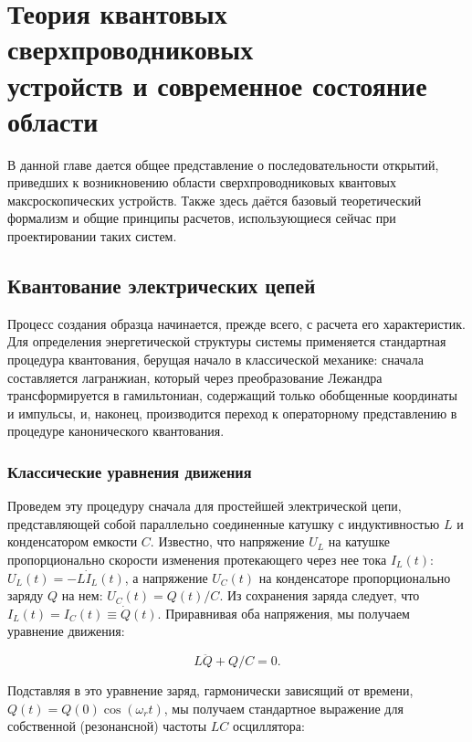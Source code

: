 \documentclass[14pt, a4paper]{extreport}
\numberwithin{equation}{section}
\begin{document}
\chapter{Теория квантовых сверхпроводниковых\\ устройств и современное состояние области}

В данной главе дается общее представление о последовательности открытий, приведших к возникновению области сверхпроводниковых квантовых максроскопических устройств. Также здесь даётся базовый теоретический формализм и общие принципы расчетов, использующиеся сейчас при проектировании таких систем. 

\section{Квантование электрических цепей}\label{sec:circuit_quantization}


Процесс создания образца начинается, прежде всего, с расчета его характеристик. Для определения энергетической структуры системы применяется стандартная процедура квантования, берущая начало в классической механике: сначала составляется лагранжиан, который через преобразование Лежандра трансформируется в гамильтониан, содержащий только обобщенные координаты и импульсы, и, наконец, производится переход к операторному представлению в процедуре канонического квантования. 

\subsection{Классические уравнения движения}


Проведем эту процедуру сначала для простейшей электрической цепи, представляющей собой параллельно соединенные катушку с индуктивностью $L$ и конденсатором емкости $C$. Известно, что напряжение $U_L$ на катушке пропорционально скорости изменения протекающего через нее тока $I_L(t)$: $U_L(t) = - L \dot I_L(t)$, а напряжение $U_C(t)$ на конденсаторе пропорционально заряду $Q$ на нем: $U_C(t) = Q(t)/C$. Из сохранения заряда следует, что $I_L(t) = I_C(t) \equiv \dot Q(t)$. Приравнивая оба напряжения, мы получаем уравнение движения:

\begin{equation}
L \ddot Q + Q/C = 0.
\end{equation}

Подставляя в это уравнение заряд, гармонически зависящий от времени, $Q(t) = Q(0) \cos(\omega_r t)$, мы получаем стандартное выражение для собственной (резонансной) частоты $LC$ осциллятора:
\end{document}
